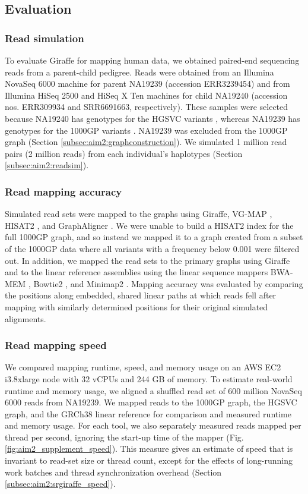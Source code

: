 \documentclass[11pt]{ucscthesis}
\begin{document}
\subsection{Evaluation}
\subsubsection{Read simulation}
To evaluate Giraffe for mapping human data, we obtained paired-end sequencing reads from a parent-child pedigree.
Reads were obtained from an Illumina NovaSeq 6000 machine for parent NA19239 (accession ERR3239454) and from Illumina HiSeq 2500 and HiSeq X Ten machines for child NA19240 (accession nos. ERR309934 and SRR6691663, respectively).
These samples were selected because NA19240 has genotypes for the HGSVC variants \cite{chaisson_sv_2019}, whereas NA19239 has genotypes for the 1000GP variants \cite{1000gp_2015}.
NA19239 was excluded from the 1000GP graph (Section \ref{subsec:aim2:graphconstruction}).
We simulated 1 million read pairs (2 million reads) from each individual’s haplotypes (Section \ref{subsec:aim2:readsim}).

\subsubsection{Read mapping accuracy}
Simulated read sets were mapped to the graphs using Giraffe, VG-MAP \cite{garrison_vg_2018}, HISAT2 \cite{kim_hisat2_2019}, and GraphAligner \cite{rautiainen_graphaligner_2020}.
We were unable to build a HISAT2 index for the full 1000GP graph, and so instead we mapped it to a graph created from a subset of the 1000GP data where all variants with a frequency below 0.001 were filtered out.
In addition, we mapped the read sets to the primary graphs using Giraffe and to the linear reference assemblies using the linear sequence mappers BWA-MEM \cite{li_bwa_mem_2013}, Bowtie2 \cite{langmead_bowtie2_2012}, and Minimap2 \cite{li_minimap2_2018}.
Mapping accuracy was evaluated by comparing the positions along embedded, shared linear paths at which reads fell after mapping with similarly determined positions for their original simulated alignments.

\subsubsection{Read mapping speed}
We compared mapping runtime, speed, and memory usage on an AWS EC2 i3.8xlarge node with 32 vCPUs and 244 GB of memory.
To estimate real-world runtime and memory usage, we aligned a shuffled read set of 600 million NovaSeq 6000 reads from NA19239.
We mapped reads to the 1000GP graph, the HGSVC graph, and the GRCh38 linear reference for comparison and measured runtime and memory usage.
For each tool, we also separately measured reads mapped per thread per second, ignoring the start-up time of the mapper (Fig.\ref*{fig:aim2_supplement_speed}).
This measure gives an estimate of speed that is invariant to read-set size or thread count, except for the effects of long-running work batches and thread synchronization overhead (Section \ref{subsec:aim2:srgiraffe_speed}).
\end{document}
